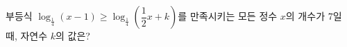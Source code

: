 부등식 $\log_{\frac{1}{4}} (x-1)\ge\log_{\frac{1}{4}} \left(\dfrac{1}{2}x+k\right)$를 만족시키는 모든 정수 $x$의 개수가 7일 때, 자연수 $k$의 값은?
